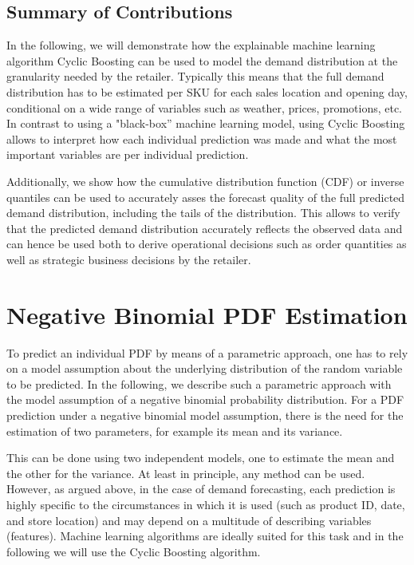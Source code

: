 \documentclass[BCOR=1mm, DIV=calc,10pt,
twoside=true,
twocolumn,
headings=normal]{scrartcl}
\begin{document}
\subsection*{Summary of Contributions}

In the following, we will demonstrate how the explainable machine learning algorithm Cyclic Boosting \cite{Wick2019} can be used to model the demand distribution at the granularity needed by the retailer. Typically this means that the full demand distribution has to be estimated per SKU for each sales location and opening day, conditional on a wide range of variables such as weather, prices, promotions, etc. In contrast to using a "black-box'' machine learning model, using Cyclic Boosting allows to interpret how each individual prediction was made and what the most important variables are per individual prediction.

Additionally, we show how the cumulative distribution function (CDF) or inverse quantiles can be used to accurately asses the forecast quality of the full predicted demand distribution, including the tails of the distribution. This allows to verify that the predicted demand distribution accurately reflects the observed data and can hence be used both to derive operational decisions such as  order quantities as well as strategic business decisions by the retailer.


\section{Negative Binomial PDF Estimation}
\label{sec:pdfEstimation}

To predict an individual PDF by means of a parametric approach, one has to rely on a model assumption about the underlying distribution of the random variable to be predicted. In the following, we describe such a parametric approach with the model assumption of a negative binomial probability distribution. For a PDF prediction under a negative binomial model assumption, there is the need for the estimation of two parameters, for example its mean and its variance.

This can be done using two independent models, one to estimate the mean and the other for the variance. At least in principle, any method can be used. However, as argued above, in the case of demand forecasting, each prediction is highly specific to the circumstances in which it is used (such as product ID, date, and store location) and may depend on  a multitude of describing variables (features). Machine learning algorithms are ideally suited for this task and in the following we will use the Cyclic Boosting algorithm.
\end{document}
